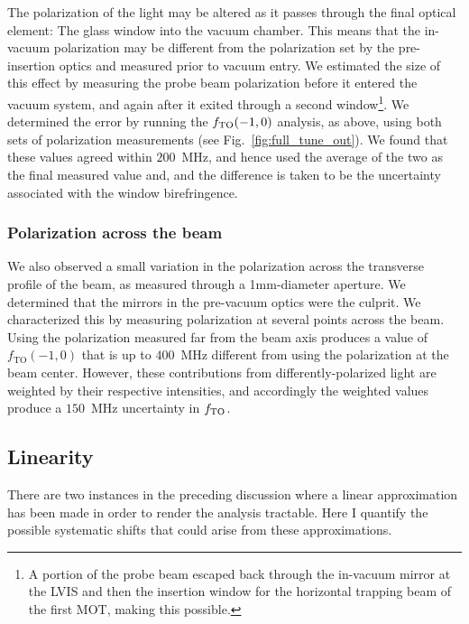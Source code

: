 	The polarization of the light may be altered as it passes through the final optical element: The glass window into the vacuum chamber.
	This means that the in-vacuum polarization may be different from the polarization set by the pre-insertion optics and measured prior to vacuum entry.
 	We estimated the size of this effect by measuring the probe beam polarization before it entered the vacuum system, and again after it exited through a second window\footnote{A portion of the probe beam escaped back through the in-vacuum mirror at the LVIS and then the insertion window for the horizontal trapping beam of the first MOT, making this possible.}.
 	We determined the error by running the $f_\mathrm{TO}(-1,0)$ analysis, as above, using both sets of polarization measurements (see Fig.~\ref{fig:full_tune_out}). 
 	We found that these values agreed within \(200\)~MHz, and hence used the average of the two as the final measured value and, and the difference is taken to be the uncertainty associated with the window birefringence. 

\subsubsection{Polarization across the beam}

	We also observed a small variation in the polarization across the transverse profile of the beam, as measured through a 1mm-diameter aperture.
	We determined that the mirrors in the pre-vacuum optics were the culprit.
	We characterized this by measuring polarization at several points across the beam.
	Using the polarization measured far from the beam axis produces a value of \(f_{\mathrm{TO}}(-1,0)\) that is up to \(400\)~MHz different from using the polarization at the beam center. 
	However, these contributions from differently-polarized light are weighted by their respective intensities, and accordingly the  weighted values produce a \(150\)~MHz uncertainty in $f_\mathrm{TO}$.

\subsection{Linearity} \label{sec:syst.subsec:lin}
	There are two instances in the preceding discussion where a linear approximation has been made in order to render the analysis tractable.
	Here I quantify the possible systematic shifts that could arise from these approximations.

